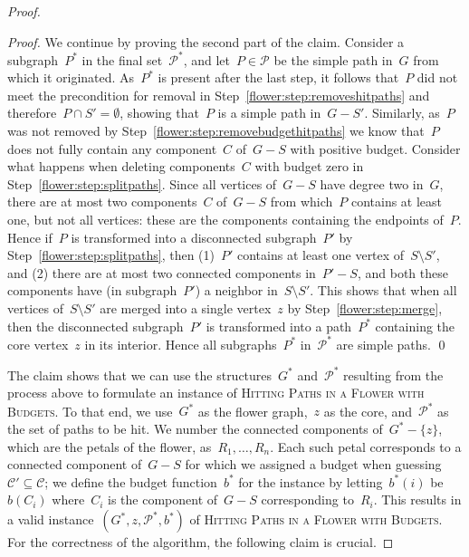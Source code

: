 \let\accentvec\vec  \documentclass{llncs}
\newcommand{\claimqed}{\renewcommand{\squareforqed}{$\lrcorner$}\qed\renewcommand{\squareforqed}{\plainsquareforqed}}
\newcommand{\C}{{\mathcal{C}}}
\renewcommand{\P}{\ensuremath{\mathcal{P}}\xspace}
\renewcommand{\C}{\ensuremath{\mathcal{C}}\xspace}
\newcommand{\HitPathsInFlower}{\textsc{Hitting Paths in a Flower with Budgets}\xspace}
\begin{document}
\begin{proof}
\begin{proof}
We continue by proving the second part of the claim. Consider a subgraph~$P^*$ in the final set~$\P^*$, and let~$P \in \P$ be the simple path in~$G$ from which it originated. As~$P^*$ is present after the last step, it follows that~$P$ did not meet the precondition for removal in Step~\ref{flower:step:removeshitpaths} and therefore~$P \cap S' = \emptyset$, showing that~$P$ is a simple path in~$G - S'$. Similarly, as~$P$ was not removed by Step~\ref{flower:step:removebudgethitpaths} we know that~$P$ does not fully contain any component~$C$ of~$G - S$ with positive budget. Consider what happens when deleting components~$C$ with budget zero in Step~\ref{flower:step:splitpaths}. Since all vertices of~$G - S$ have degree two in~$G$, there are at most two components~$C$ of~$G - S$ from which~$P$ contains at least one, but not all vertices: these are the components containing the endpoints of~$P$. Hence if~$P$ is transformed into a disconnected subgraph~$P'$ by Step~\ref{flower:step:splitpaths}, then (1)~$P'$ contains at least one vertex of~$S \setminus S'$, and (2) there are at most two connected components in~$P' - S$, and both these components have (in subgraph~$P'$) a neighbor in~$S \setminus S'$. This shows that when all vertices of~$S \setminus S'$ are merged into a single vertex~$z$ by Step~\ref{flower:step:merge}, then the disconnected subgraph~$P'$ is transformed into a path~$P^*$ containing the core vertex~$z$ in its interior. Hence all subgraphs~$P^*$ in~$\P^*$ are simple paths.
\claimqed
\end{proof}

The claim shows that we can use the structures~$G^*$ and~$\P^*$ resulting from the process above to formulate an instance of \HitPathsInFlower. To that end, we use~$G^*$ as the flower graph,~$z$ as the core, and~$\P^*$ as the set of paths to be hit. We number the connected components of~$G^* - \{z\}$, which are the petals of the flower, as~$R_1, \ldots, R_n$. Each such petal corresponds to a connected component of~$G - S$ for which we assigned a budget when guessing~$\C' \subseteq \C$; we define the budget function~$b^*$ for the instance by letting~$b^*(i)$ be~$b(C_i)$ where~$C_i$ is the component of~$G - S$ corresponding to~$R_i$. This results in a valid instance~$(G^*,z,\P^*,b^*)$ of \HitPathsInFlower. For the correctness of the algorithm, the following claim is crucial.


\end{proof}
\end{document}
